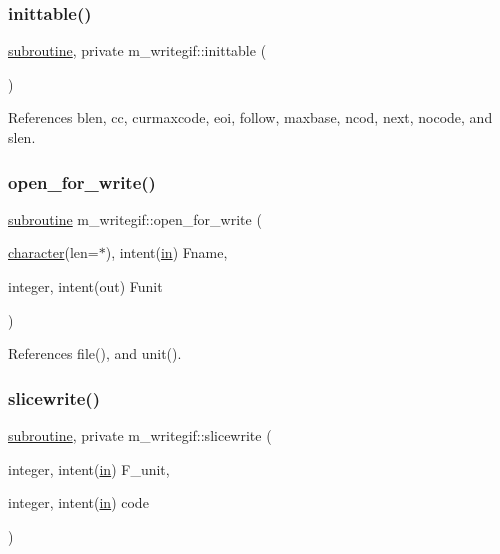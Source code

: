 \subsubsection{\texorpdfstring{inittable()}{inittable()}}
{\footnotesize\ttfamily \hyperlink{M__stopwatch_83_8txt_acfbcff50169d691ff02d4a123ed70482}{subroutine}, private m\+\_\+writegif\+::inittable (\begin{DoxyParamCaption}{ }\end{DoxyParamCaption})\hspace{0.3cm}{\ttfamily [private]}}



References blen, cc, curmaxcode, eoi, follow, maxbase, ncod, next, nocode, and slen.

\mbox{\label{namespacem__writegif_adb045213dd61508ad7dc7e5640fde67d}} 
\subsubsection{\texorpdfstring{open\+\_\+for\+\_\+write()}{open\_for\_write()}}
{\footnotesize\ttfamily \hyperlink{M__stopwatch_83_8txt_acfbcff50169d691ff02d4a123ed70482}{subroutine} m\+\_\+writegif\+::open\+\_\+for\+\_\+write (\begin{DoxyParamCaption}\item[{\hyperlink{option__stopwatch_83_8txt_abd4b21fbbd175834027b5224bfe97e66}{character}(len=$\ast$), intent(\hyperlink{M__journal_83_8txt_afce72651d1eed785a2132bee863b2f38}{in})}]{Fname,  }\item[{integer, intent(out)}]{Funit }\end{DoxyParamCaption})\hspace{0.3cm}{\ttfamily [private]}}



References file(), and unit().

\mbox{\label{namespacem__writegif_a27e0ec2c6e05428641179bf35762adb7}} 
\subsubsection{\texorpdfstring{slicewrite()}{slicewrite()}}
{\footnotesize\ttfamily \hyperlink{M__stopwatch_83_8txt_acfbcff50169d691ff02d4a123ed70482}{subroutine}, private m\+\_\+writegif\+::slicewrite (\begin{DoxyParamCaption}\item[{integer, intent(\hyperlink{M__journal_83_8txt_afce72651d1eed785a2132bee863b2f38}{in})}]{F\+\_\+unit,  }\item[{integer, intent(\hyperlink{M__journal_83_8txt_afce72651d1eed785a2132bee863b2f38}{in})}]{code }\end{DoxyParamCaption})\hspace{0.3cm}{\ttfamily [private]}}



